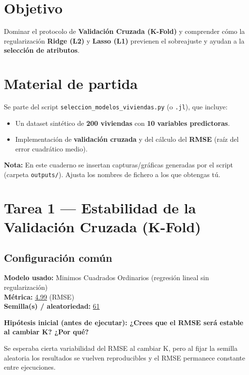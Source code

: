 \documentclass[12pt,oneside]{book}
\begin{document}
\section*{Objetivo}
Dominar el protocolo de \textbf{Validación Cruzada (K-Fold)} y comprender cómo la regularización
\textbf{Ridge (L2)} y \textbf{Lasso (L1)} previenen el sobreajuste y ayudan a la \textbf{selección de atributos}.

\section*{Material de partida}
Se parte del script \texttt{seleccion\_modelos\_viviendas.py} (o \texttt{.jl}), que incluye:
\begin{itemize}
    \item Un dataset sintético de \textbf{200 viviendas} con \textbf{10 variables predictoras}.
    \item Implementación de \textbf{validación cruzada} y del cálculo del \textbf{RMSE} (raíz del error cuadrático medio).
\end{itemize}

\vspace{0.4cm}
\noindent\textbf{Nota:} En este cuaderno se insertan capturas/gráficas generadas por el script (carpeta \texttt{outputs/}).
Ajusta los nombres de fichero a los que obtengas tú.

\section{Tarea 1 — Estabilidad de la Validación Cruzada (K-Fold)}

\subsection*{Configuración común}
\noindent\textbf{Modelo usado:} Minimos Cuadrados Ordinarios (regresión lineal sin regularización)\\
\textbf{Métrica:} \underline{4.99} (RMSE)\\
\textbf{Semilla(s) / aleatoriedad:} \underline{61}

\newpage

\noindent\textbf{Hipótesis inicial (antes de ejecutar):
¿Crees que el RMSE será estable al cambiar K? ¿Por qué? }

Se esperaba cierta variabilidad del RMSE al cambiar K, pero al fijar la semilla aleatoria los resultados se vuelven reproducibles y el RMSE permanece constante entre ejecuciones.
\end{document}
